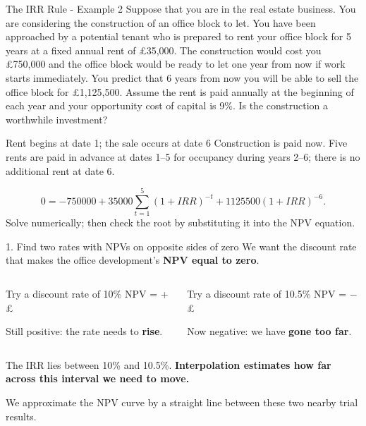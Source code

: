 \documentclass[9pt,aspectratio=169]{beamer}
\begin{document}
\begin{frame}{The IRR Rule - Example 2}
Suppose that you are in the real estate business. You are considering the construction of an office block to let. You have been approached by a potential tenant who is prepared to rent your office block for 5 years at a fixed annual rent of £35,000. The construction would cost you £750,000 and the office block would be ready to let one year from now if work starts immediately. You predict that 6 years from now you will be able to sell the office block for £1,125,500. Assume the rent is paid annually at the beginning of each year and your opportunity cost of capital is 9\%. Is the construction a worthwhile investment?
\end{frame}

\begin{frame}{Rent begins at date 1; the sale occurs at date 6}
Construction is paid now. Five rents are paid in advance at dates 1--5 for occupancy during years 2--6; there is no additional rent at date 6.
\begin{center}

\end{center}
\[0=-750000+35000\sum_{t=1}^{5}(1+IRR)^{-t}+1125500(1+IRR)^{-6}.\]
Solve numerically; then check the root by substituting it into the NPV equation.
\end{frame}

\begin{frame}{1. Find two rates with NPVs on opposite sides of zero}
We want the discount rate that makes the office development's \textbf{NPV equal to zero}.
\medskip
\begin{columns}[T,onlytextwidth]
\begin{block}{Try a discount rate of 10\%}
{\large\color{StAndrewsBlue}NPV = +£\InterpPositive}

Still positive: the rate needs to \textbf{rise}.
\end{block}
\begin{block}{Try a discount rate of 10.5\%}
{\large\color{StAndrewsBurgundy}NPV = −£\InterpNegative}

Now negative: we have \textbf{gone too far}.
\end{block}
\end{columns}
\medskip
The IRR lies between 10\% and 10.5\%. \textbf{Interpolation estimates how far across this interval we need to move.}

We approximate the NPV curve by a straight line between these two nearby trial results.
\end{frame}
\end{document}
